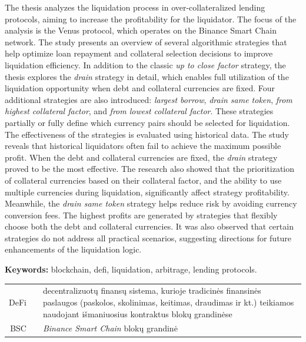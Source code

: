 \documentclass[]{VUMIFTemplateClass}
\begin{document}
The thesis analyzes the liquidation process in over-collateralized lending protocols, aiming to increase the profitability for the liquidator. The focus of the analysis is the Venus protocol, which operates on the Binance Smart Chain network. The study presents an overview of several algorithmic strategies that help optimize loan repayment and collateral selection decisions to improve liquidation efficiency. In addition to the classic \textit{up to close factor} strategy, the thesis explores the \textit{drain} strategy in detail, which enables full utilization of the liquidation opportunity when debt and collateral currencies are fixed. Four additional strategies are also introduced: \textit{largest borrow}, \textit{drain same token}, \textit{from highest collateral factor}, and \textit{from lowest collateral factor}. These strategies partially or fully define which currency pairs should be selected for liquidation. The effectiveness of the strategies is evaluated using historical data.
The study reveals that historical liquidators often fail to achieve the maximum possible profit. When the debt and collateral currencies are fixed, the \textit{drain} strategy proved to be the most effective. The research also showed that the prioritization of collateral currencies based on their collateral factor, and the ability to use multiple currencies during liquidation, significantly affect strategy profitability. Meanwhile, the \textit{drain same token} strategy helps reduce risk by avoiding currency conversion fees. The highest profits are generated by strategies that flexibly choose both the debt and collateral currencies. It was also observed that certain strategies do not address all practical scenarios, suggesting directions for future enhancements of the liquidation logic.

\noindent\textbf{Keywords:} blockchain, defi, liquidation, arbitrage, lending protocols.

\begin{tabular}{rcp{}}
    {DeFi} & {} & {decentralizuotų finansų sistema, kurioje tradicinės finansinės paslaugos (paskolos, skolinimas, keitimas, draudimas ir kt.) teikiamos naudojant išmaniuosius kontraktus blokų grandinėse} \\ 
    {BSC} & {} & {\textit{Binance Smart Chain} blokų grandinė}
\end{tabular}
\end{document}
